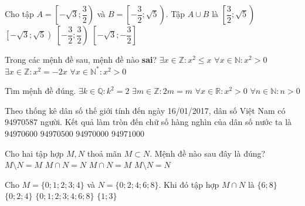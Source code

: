 \begin{ex}%
	Cho tập $A=\left[ -\sqrt{3};\dfrac{3}{2}\right) $ và $B=\left[ -\dfrac{3}{2};\sqrt{5}\right) $. Tập $A\cup B$ là
	\choice
	{$\left[ \dfrac{3}{2};\sqrt{5}\right) $}
	{\True $\left[ -\sqrt{3};\sqrt{5}\right) $}
	{$\left[ -\dfrac{3}{2};\dfrac{3}{2}\right) $}
	{$\left[ -\sqrt{3};-\dfrac{3}{2}\right] $}
	\loigiai{
		$A\cup B=\left[ -\sqrt{3};\sqrt{5}\right).$
	}
\end{ex}

\begin{ex}%
	Trong các mệnh đề sau, mệnh đề nào \textbf{sai}?
	\choice
	{$\exists x\in\mathbb{Z}:x^2\leq x$}
	{\True $\forall x\in\mathbb{N}:x^2>0$}
	{$\exists x\in\mathbb{Z}:x^2=-2x$}
	{$\forall x\in\mathbb{N^*}:x^2>0$}
\end{ex}

\begin{ex}%
	Tìm mệnh đề đúng.
	\choice
	{$\exists k\in\mathbb{Q}:k^2=2$}
	{\True $\exists m\in\mathbb{Z}:2m=m$}
	{$\forall x\in\mathbb{R}:x^2> 0$}
	{$\forall n\in\mathbb{N}: n > 0$}
\end{ex}

\begin{ex}%
	Theo thống kê dân số thế giới tính đến ngày 16/01/2017, dân số Việt Nam có $ 94970587 $ người. Kết quả làm tròn đến chữ số hàng nghìn của dân số nước ta là
	\choice
	{ $ 94970600$}
	{ $ 94970500 $}
	{ $ 94970000 $}
	{ \True $  94971000$}
		\loigiai{
	}
\end{ex}

\begin{ex}%
	Cho hai tập hợp $M,N$ thoả mãn $M \subset N$. Mệnh đề nào sau đây là đúng?
	\choice
	{$M \setminus N=M$}
	{\True $M \cap N=N$}
	{$M \cap N=M$}
	{$M \setminus N=N$}
\end{ex}

\begin{ex}%
	Cho $M=\lbrace 0;1;2;3;4 \rbrace$ và $N= \lbrace 0;2;4;6;8 \rbrace$. Khi đó tập hợp $M \cap N$ là
	\choice
	{$\lbrace 6;8  \rbrace $}
	{\True $ \lbrace 0;2;4  \rbrace$}
	{$\lbrace  0;1;2;3;4;6;8 \rbrace $}
	{$\lbrace 1;3  \rbrace$}
\end{ex}

